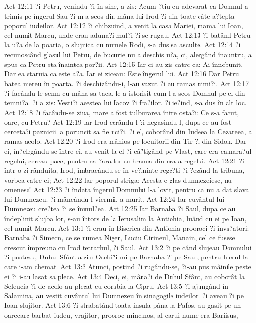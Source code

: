 Act 12:11  ?i Petru, venindu-?i în sine, a zis: Acum ?tiu cu adevarat ca Domnul a trimis pe îngerul Sau ?i m-a scos din mâna lui Irod ?i din toate câte a?tepta poporul iudeilor.
Act 12:12  ?i chibzuind, a venit la casa Mariei, mama lui Ioan, cel numit Marcu, unde erau aduna?i mul?i ?i se rugau.
Act 12:13  ?i batând Petru la u?a de la poarta, o slujnica cu numele Rodi, s-a dus sa asculte.
Act 12:14  ?i recunoscând glasul lui Petru, de bucurie nu a deschis u?a, ci, alergând înauntru, a spus ca Petru sta înaintea por?ii.
Act 12:15  Iar ei au zis catre ea: Ai înnebunit. Dar ea staruia ca este a?a. Iar ei ziceau: Este îngerul lui.
Act 12:16  Dar Petru batea mereu în poarta. ?i deschizându-i, l-au vazut ?i au ramas uimi?i.
Act 12:17  ?i facându-le semn cu mâna sa taca, le-a istorisit cum l-a scos Domnul pe el din temni?a. ?i a zis: Vesti?i acestea lui Iacov ?i fra?ilor. ?i ie?ind, s-a dus în alt loc.
Act 12:18  ?i facându-se ziua, mare a fost tulburarea între osta?i: Ce s-a facut, oare, cu Petru?
Act 12:19  Iar Irod cerându-l ?i negasindu-l, dupa ce au fost cerceta?i paznicii, a poruncit sa fie uci?i. ?i el, coborând din Iudeea la Cezareea, a ramas acolo.
Act 12:20  ?i Irod era mânios pe locuitorii din Tir ?i din Sidon. Dar ei, în?elegându-se între ei, au venit la el ?i câ?tigând pe Vlast, care era camara?ul regelui, cereau pace, pentru ca ?ara lor se hranea din cea a regelui.
Act 12:21  ?i într-o zi rânduita, Irod, îmbracându-se în ve?minte rege?ti ?i ?ezând la tribuna, vorbea catre ei;
Act 12:22  Iar poporul striga: Acesta e glas dumnezeiesc, nu omenesc!
Act 12:23  ?i îndata îngerul Domnului l-a lovit, pentru ca nu a dat slava lui Dumnezeu. ?i mâncându-l viermii, a murit.
Act 12:24  Iar cuvântul lui Dumnezeu cre?tea ?i se înmul?ea.
Act 12:25  Iar Barnaba ?i Saul, dupa ce au îndeplinit slujba lor, s-au întors de la Ierusalim la Antiohia, luând cu ei pe Ioan, cel numit Marcu.
Act 13:1  ?i erau în Biserica din Antiohia prooroci ?i înva?atori: Barnaba ?i Simeon, ce se numea Niger, Luciu Cirineul, Manain, cel ce fusese crescut împreuna cu Irod tetrarhul, ?i Saul.
Act 13:2  ?i pe când slujeau Domnului ?i posteau, Duhul Sfânt a zis: Osebi?i-mi pe Barnaba ?i pe Saul, pentru lucrul la care i-am chemat.
Act 13:3  Atunci, postind ?i rugându-se, ?i-au pus mâinile peste ei ?i i-au lasat sa plece.
Act 13:4  Deci, ei, mâna?i de Duhul Sfânt, au coborât la Seleucia ?i de acolo au plecat cu corabia la Cipru.
Act 13:5  ?i ajungând în Salamina, au vestit cuvântul lui Dumnezeu în sinagogile iudeilor. ?i aveau ?i pe Ioan slujitor.
Act 13:6  ?i strabatând toata insula pâna la Pafos, au gasit pe un oarecare barbat iudeu, vrajitor, prooroc mincinos, al carui nume era Bariisus,
